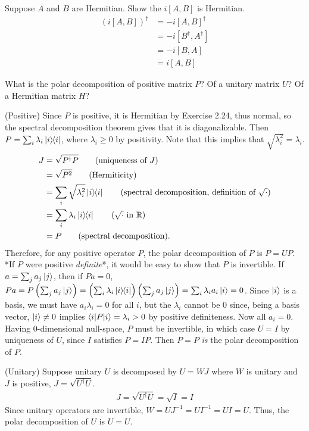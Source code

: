  Suppose $A$ and $B$ are Hermitian.  Show the $i[A,B]$ is Hermitian.
\Soln
\begin{align*}
	\left(i \left[A, B\right] \right)^\dagger &= -i \left[A, B\right]^\dagger \tag{distribute $^\dagger$} \\
		&= -i \left[B^\dagger, A^\dagger \right] \tag{Exercise 2.45}\\
		&= -i \left[B, A \right] \tag{$A$ and $B$ are Hermitian}\\
		&= i \left[A, B\right] \tag{Exercise 2.46}
\end{align*}

 What is the polar decomposition of positive matrix $P$?  Of a unitary matrix $U$? Of a Hermitian matrix $H$?
\Soln

(Positive)  Since $P$ is positive, it is Hermitian by Exercise 2.24, thus normal, so the spectral decomposition theorem gives that it is diagonalizable. Then $P = \sum_i \lambda_i \ket{i}\hspace{-1mm} \bra{i}$,  where $\lambda_i \geq 0$ by positivity. Note that this implies that $\sqrt{\lambda_i^2}=\lambda_i$.
\begin{align*}
	J &= \sqrt{P^\dagger P} \tag{uniqueness of $J$}\\
	&= \sqrt{P^2} \tag{Hermiticity}\\
	&= \sum_i \sqrt{\lambda_i^2} \kb{i} \tag{spectral decomposition, definition of $\sqrt{\cdot}$}\\
	&= \sum_i \lambda_i \kb{i} \tag{$\sqrt{\cdot}$ in $\mathbb{R}$}\\
	& = P \tag{spectral decomposition}.
\end{align*}
Therefore, for any positive operator $P$, the polar decomposition of $P$ is $P = UP$.  *If $P$ were positive \textit{definite}*, it would be easy to show that $P$ is invertible.  If $a=\sum_j a_j\ket{j}$, then if $Pa = 0$, $Pa = P\left(\sum_j a_j\ket{j}\right) = \Bigl(\sum_i \lambda_i \ket{i}\hspace{-1mm} \bra{i}\Bigr)\left(\sum_j a_j\ket{j}\right) = \sum_i \lambda_i a_i \ket{i} = 0$. Since $\ket{i}$ is a basis, we must have $a_i\lambda_i=0$ for all $i$, but the $\lambda_i$ cannot be 0 since, being a basis vector, $\ket{i}\neq 0$ implies $\braket{i|P|i} =\lambda_i >0$ by positive definiteness.  Now all $a_i = 0$.  Having 0-dimensional null-space, $P$ must be invertible, in which case $U=I$ by uniqueness of $U$, since $I$ satisfies $P = IP$. Then $P = P$ \textit{is} the polar decomposition of $P$.



\vspace{3mm}(Unitary) Suppose unitary $U$ is decomposed by $U = WJ$ where $W$ is unitary and $J$ is positive, $J = \sqrt{U^\dagger U}$.
\begin{align*}
	J = \sqrt{U^\dagger U} = \sqrt{I} = I
\end{align*}
Since unitary operators are invertible, $W = UJ^{-1} = UI^{-1} = UI = U$.
Thus, the polar decomposition of $U$ is $U = U$.


